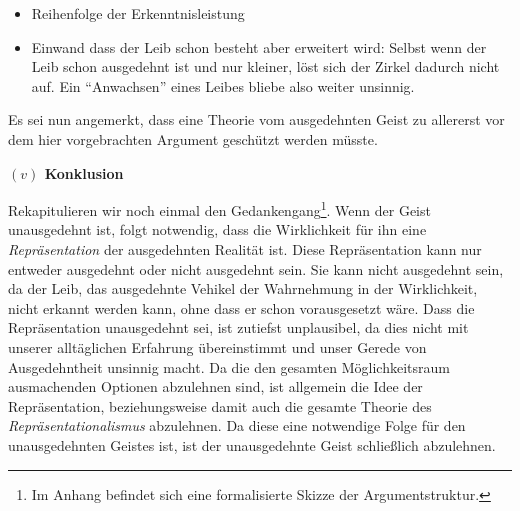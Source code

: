 \documentclass[a4paper, 12pt]{article}
\begin{document}
\begin{onehalfspace}

\begin{itemize}
  \item Reihenfolge der Erkenntnisleistung
  \item Einwand dass der Leib schon besteht aber erweitert wird: Selbst wenn der Leib schon ausgedehnt ist und nur kleiner, löst sich der Zirkel dadurch nicht auf. Ein "`Anwachsen"' eines Leibes bliebe also weiter unsinnig. 
\end{itemize}

Es sei nun angemerkt, dass eine Theorie vom ausgedehnten Geist zu allererst vor dem hier vorgebrachten Argument geschützt werden müsste. 





\vspace{5mm}
\noindent\textbf{$(v)$ Konklusion}

\noindent Rekapitulieren wir noch einmal den Gedankengang\footnote{Im Anhang befindet sich eine formalisierte Skizze der Argumentstruktur.}. Wenn der Geist unausgedehnt ist, folgt notwendig, dass die Wirklichkeit für ihn eine \emph{Repräsentation} der ausgedehnten Realität ist. Diese Repräsentation kann nur entweder ausgedehnt oder nicht ausgedehnt sein. Sie kann nicht ausgedehnt sein, da der Leib, das ausgedehnte Vehikel der Wahrnehmung in der Wirklichkeit, nicht erkannt werden kann, ohne dass er schon vorausgesetzt wäre. Dass die Repräsentation unausgedehnt sei, ist zutiefst unplausibel, da dies nicht mit unserer alltäglichen Erfahrung übereinstimmt und unser Gerede von Ausgedehntheit unsinnig macht. Da die den gesamten Möglichkeitsraum ausmachenden Optionen abzulehnen sind, ist allgemein die Idee der Repräsentation, beziehungsweise damit auch die gesamte Theorie des \emph{Repräsentationalismus} abzulehnen. Da diese eine notwendige Folge für den unausgedehnten Geistes ist, ist der unausgedehnte Geist schließlich abzulehnen.






\end{onehalfspace}
\end{document}
